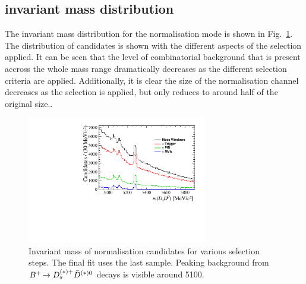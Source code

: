 \subsection{\Bp invariant mass distribution}

The \Bp invariant mass distribution for the normalisation mode is shown in Fig.~\ref{fig:norm_selection}. The distribution of candidates is shown with the different aspects of the selection applied. It can be seen that the level of combinatorial background that is present accross the whole mass range dramatically decreases as the different selection criteria are applied. Additionally, it is clear the size of the normalisation channel decreases as the selection is applied, but only reduces to around half of the original size..


\begin{figure}[!h]
    \centering
        \includegraphics[width=0.7\textwidth]{figs/Selection/Normalisation_with_sel_B2DsD0.pdf}
    \caption{Invariant mass of normalisation candidates for various selection steps. The final fit uses the last sample. Peaking background from ${{{B}^+}}\!\rightarrow D_{s}^{(*)+}\bar{D}^{(*)0}$ decays is visible around 5100\mevcc.}
    \label{fig:norm_selection}   
\end{figure}


